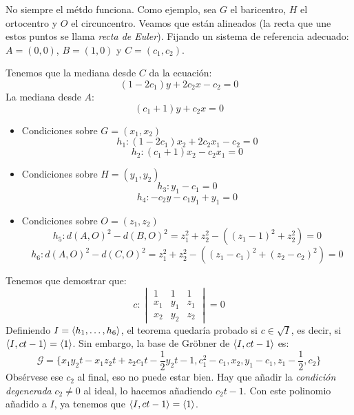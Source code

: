 \documentclass[twoside]{report}
\begin{document}
No siempre el métdo funciona.
Como ejemplo, sea $G$ el baricentro, $H$ el ortocentro y $O$ el circuncentro.
Veamos que están alineados (la recta que une estos puntos se llama \emph{recta de Euler}).
Fijando un sistema de referencia adecuado: $A=(0,0)$, $B=(1,0)$ y $C=(c_1,c_2)$.

Tenemos que la mediana desde $C$ da la ecuación:
\[ (1-2c_1)y+2c_2x-c_2 = 0 \]
La mediana desde $A$:
\[ (c_1+1)y+c_2x = 0 \]

\begin{itemize}
\item Condiciones sobre $G=(x_1,x_2)$
\[ h_1 \colon (1-2c_1)x_2 + 2c_2x_1 - c_2 = 0 \]
\[ h_2 \colon (c_1+1)x_2 - c_2x_1 = 0 \]
\item Condiciones sobre $H = (y_1,y_2)$
\[ h_3 \colon y_1 - c_1 = 0 \]
\[ h_4 \colon -c_2 y - c_1 y_1 + y_1 = 0 \]
\item Condiciones sobre $O = (z_1,z_2)$
\[ h_5 \colon d(A,O)^2 - d(B,O)^2 = z_1^2+z_2^2 - \left((z_1-1)^2+z_2^2\right) = 0 \]
\[ h_6 \colon d(A,O)^2 - d(C,O)^2 = z_1^2+z_2^2 - \left((z_1-c_1)^2+(z_2-c_2)^2\right) = 0 \]
\end{itemize}
Tenemos que demostrar que:
\[ c \colon \begin{vmatrix}1 & 1 & 1\\x_1 & y_1 & z_1\\x_2 & y_2 & z_2\end{vmatrix} = 0\]
Definiendo $I = \langle{h_1,\dots,h_6}\rangle$, el teorema quedaría probado si $c \in \sqrt{I}$, es decir, si $\langle{I,ct-1}\rangle=\langle{1}\rangle$.
Sin embargo, la base de Gröbner de $\langle{I,ct-1}\rangle$ es:
\[ \mathcal{G} = \{x_1y_2t-x_1z_2t+z_2c_1t-\frac{1}{2}y_2t-1, c_1^2-c_1, x_2, y_1-c_1, z_1-\frac{1}{2},c_2 \}\]
Obsérvese ese $c_2$ al final, eso no puede estar bien.
Hay que añadir la \emph{condición degenerada} $c_2 \neq 0$ al ideal, lo hacemos añadiendo $c_2t-1$.
Con este polinomio añadido a $I$, ya tenemos que $\langle{I,ct-1}\rangle = \langle{1}\rangle$.
\end{document}
